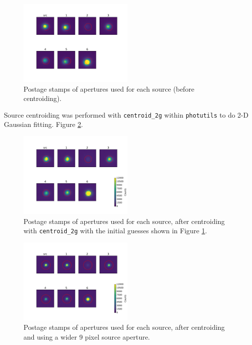 \documentclass[twocolumn]{aastex61}
\begin{document}
\begin{figure}
\begin{centering}
\includegraphics[width=0.5\textwidth]{images/postage_stamps.pdf}
\caption{Postage stamps of apertures used for each source (before centroiding).}\label{fig:starPostageGuess}
\end{centering}
\end{figure}

Source centroiding was performed with \texttt{centroid\_2g} within \texttt{photutils} to do 2-D Gaussian fitting. Figure \ref{fig:starPostageCen}.

\begin{figure}
\begin{centering}
\includegraphics[width=0.5\textwidth]{images/postage_stamps_centered.pdf}
\caption{Postage stamps of apertures used for each source, after centroiding with \texttt{centroid\_2g} with the initial guesses shown in Figure \ref{fig:starPostageGuess}.}\label{fig:starPostageCen}
\end{centering}
\end{figure}

\begin{figure}
\begin{centering}
\includegraphics[width=0.5\textwidth]{images/postage_stamps_r09px_cen.pdf}
\caption{Postage stamps of apertures used for each source, after centroiding and using a wider 9 pixel source aperture.}\label{fig:starPostageCenAp9px}
\end{centering}
\end{figure}
\end{document}
